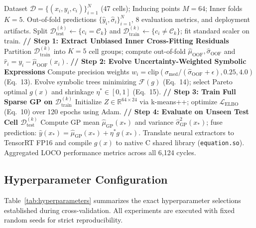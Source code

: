 \documentclass[a4paper,fleqn]{cas-sc}
\begin{document}
\begin{algorithm}[t]
\caption{WD-GPR-SR Training and LOCO Evaluation Protocol}
\label{alg:wd_gpr_sr}
\begin{algorithmic}[1]
\REQUIRE Dataset $\mathcal{D} = \{(x_i, y_i, c_i)\}_{i=1}^N$ (47 cells); Inducing points $M=64$; Inner folds $K=5$.
\ENSURE Out-of-fold predictions $\{\hat{y}_i, \hat{\sigma}_i\}_{i=1}^N$, 8 evaluation metrics, and deployment artifacts.
    \STATE Split $\mathcal{D}_{\text{test}}^{(k)} \leftarrow \{c_i = \mathcal{C}_k\}$ and $\mathcal{D}_{\text{train}}^{(k)} \leftarrow \{c_i \neq \mathcal{C}_k\}$; fit standard scaler on train.
    \STATE \textbf{// Step 1: Extract Unbiased Inner Cross-Fitting Residuals}
    \STATE Partition $\mathcal{D}_{\text{train}}^{(k)}$ into $K=5$ cell groups; compute out-of-fold $\hat{\mu}_{\text{OOF}}, \hat{\sigma}_{\text{OOF}}$ and $\hat{r}_i = y_i - \hat{\mu}_{\text{OOF}}(x_i)$.
    \STATE \textbf{// Step 2: Evolve Uncertainty-Weighted Symbolic Expressions}
    \STATE Compute precision weights $w_i = \text{clip}(\sigma_{\text{med}} / (\hat{\sigma}_{\text{OOF}} + \epsilon), 0.25, 4.0)$ (Eq.~13).
    \STATE Evolve symbolic trees minimizing $\mathcal{F}(g)$ (Eq.~14); select Pareto optimal $g(x)$ and shrinkage $\eta^* \in [0, 1]$ (Eq.~15).
    \STATE \textbf{// Step 3: Train Full Sparse GP on $\mathcal{D}_{\text{train}}^{(k)}$}
    \STATE Initialize $Z \in \mathbb{R}^{64 \times 24}$ via k-means++; optimize $\mathcal{L}_{\text{ELBO}}$ (Eq.~10) over 120 epochs using Adam.
    \STATE \textbf{// Step 4: Evaluate on Unseen Test Cell $\mathcal{D}_{\text{test}}^{(k)}$}
    \STATE Compute GP mean $\hat{\mu}_{\text{GP}}(x_*)$ and variance $\hat{\sigma}_{\text{GP}}^2(x_*)$; fuse prediction: $\hat{y}(x_*) = \hat{\mu}_{\text{GP}}(x_*) + \eta^* g(x_*)$.
\ENDFOR
\STATE Translate neural extractors to TensorRT FP16 and compile $g(x)$ to native C shared library (\texttt{equation.so}).
\RETURN Aggregated LOCO performance metrics across all 6,124 cycles.
\end{algorithmic}
\end{algorithm}

\subsection{Hyperparameter Configuration}
Table~\ref{tab:hyperparameters} summarizes the exact hyperparameter selections established during cross-validation. All experiments are executed with fixed random seeds for strict reproducibility.
\end{document}
